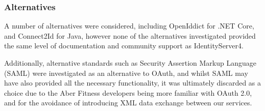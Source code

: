 \subsubsection{Alternatives}

A number of alternatives were considered, including OpenIddict\cite{openiddict} for .NET Core, and Connect2Id\cite{connect2id} for Java, however none of the alternatives investigated provided the same level of documentation and community support as IdentityServer4.

Additionally, alternative standards such as Security Assertion Markup Language (SAML) were investigated as an alternative to OAuth, and whilst SAML may have also provided all the necessary functionality, it was ultimately discarded as a choice due to the Aber Fitness developers being more familiar with OAuth 2.0, and for the avoidance of introducing XML data exchange between our services.
